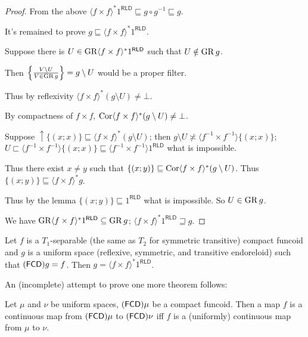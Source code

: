 \begin{proof}
From the above $\langle f \times f \rangle^{\ast} 1^{\mathsf{RLD}} \sqsubseteq g \circ
g^{- 1} \sqsubseteq g$. 

It's remained to prove $g \sqsubseteq \langle f \times f \rangle^{\ast}
1^{\mathsf{RLD}}$.


Suppose there is $U \in \operatorname{GR} \langle f \times f \rangle^{\ast} 1^{\mathsf{RLD}}$
such that $U \notin \operatorname{GR} g$.

Then $\left\{ \frac{ V \setminus U }{ V \in \operatorname{GR} g }\right\} = g \setminus U$ would be a proper filter.

Thus by reflexivity $\langle f \times f \rangle^{\ast} (g \setminus U) \neq
\bot$.

By compactness of $f \times f$, $\operatorname{Cor} \langle f \times f \rangle^{\ast}
(g \setminus U) \neq \bot$.

Suppose $\uparrow \{ (x ; x) \} \sqsubseteq \langle f \times f \rangle^{\ast}
(g \setminus U)$; then $g \setminus U \nasymp \langle f^{- 1} \times f^{- 1}
\rangle \{ (x ; x) \}$; $U \sqsubset \langle f^{- 1} \times f^{- 1} \rangle \{
(x ; x) \} \sqsubseteq \langle f^{- 1} \times f^{- 1} \rangle 1^{\mathsf{RLD}}$ what is
impossible.

Thus there exist $x \neq y$ such that $\{ (x ; y) \} \sqsubseteq \operatorname{Cor}
\langle f \times f \rangle^{\ast} (g \setminus U)$. Thus $\{ (x ; y) \}
\sqsubseteq \langle f \times f \rangle^{\ast} g$.

Thus by the lemma $\{ (x ; y) \} \sqsubseteq 1^{\mathsf{RLD}}$ what is impossible. So $U
\in \operatorname{GR} g$.

We have $\operatorname{GR} \langle f \times f \rangle^{\ast} 1^{\mathsf{RLD}} \subseteq
\operatorname{GR} g$; $\langle f \times f \rangle^{\ast} 1^{\mathsf{RLD}} \sqsupseteq g$.
\end{proof}

\begin{cor}
  Let $f$ is a $T_1$-separable (the same as $T_2$ for symmetric transitive)
  compact funcoid and $g$ is a uniform space (reflexive, symmetric, and
  transitive endoreloid) such that $(\mathsf{FCD}) g = f$. Then $g =
  \langle f \times f \rangle^{\ast} 1^{\mathsf{RLD}}$.
\end{cor}

An (incomplete) attempt to prove one more theorem follows:

\begin{thm}
  Let $\mu$ and $\nu$ be uniform spaces, $(\mathsf{FCD})
  \mu$ be a compact funcoid. Then a map $f$ is a continuous map from
  $(\mathsf{FCD}) \mu$ to $(\mathsf{FCD}) \nu$ iff $f$ is
  a (uniformly) continuous map from $\mu$ to $\nu$.
\end{thm}

